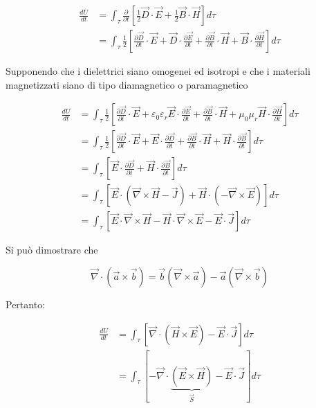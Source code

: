 \begin{equation*}
	\begin{aligned}
		\frac{dU}{dt} &= \int_{\tau}\frac{\partial}{\partial t} \left[ \frac{1}{2} \vec{D} \cdot \vec{E} + \frac{1}{2} \vec{B} \cdot \vec{H} \right] d\tau \\
		&= \int_{\tau} \frac{1}{2} \left[ \frac{\partial \vec{D}}{\partial t} \cdot \vec{E} +\vec{D} \cdot \frac{\partial \vec{E}}{\partial t} + \frac{\partial \vec{B}}{\partial t} \cdot \vec{H} + \vec{B} \cdot \frac{\partial \vec{H}}{\partial t}  \right] d\tau
	\end{aligned}
\end{equation*}

Supponendo che i dielettrici siano omogenei ed isotropi e che i materiali magnetizzati siano di tipo diamagnetico o paramagnetico

\begin{align*}
	\frac{dU}{dt} &= \int_{\tau} \frac{1}{2} \left[ \frac{\partial \vec{D}}{\partial t} \cdot \vec{E} + \varepsilon_0 \varepsilon_r \vec{E} \cdot \frac{\partial \vec{E}}{\partial t} + \frac{\partial \vec{B}}{\partial t} \cdot \vec{H} + \mu_0 \mu_r \vec{H} \cdot \frac{\partial \vec{H}}{\partial t}  \right] d\tau \\
	&= \int_{\tau} \frac{1}{2} \left[ \frac{\partial \vec{D}}{\partial t} \cdot \vec{E} + \vec{E} \cdot \frac{\partial \vec{D}}{\partial t} + \frac{\partial \vec{B}}{\partial t} \cdot \vec{H} + \vec{H} \cdot \frac{\partial \vec{B}}{\partial t}  \right] d\tau \\
	&= \int_{\tau} \left[ \vec{E} \cdot \frac{\partial \vec{D}}{\partial t} + \vec{H} \cdot \frac{\partial \vec{B}}{\partial t}  \right] d\tau \\
	&= \int_{\tau} \left[ \vec{E} \cdot \left( \vec{\nabla} \times \vec{H} -\vec{J}  \right)   + \vec{H} \cdot \left( -\vec{\nabla} \times \vec{E}  \right)    \right] d\tau \tag*{III e IV di Maxwell}\\
	&= \int_{\tau}\left[ \vec{E}\cdot  \vec{\nabla} \times \vec{H} -\vec{H} \cdot \vec{\nabla} \times \vec{E} -\vec{E} \cdot \vec{J}  \right] d\tau
\end{align*}

Si può dimostrare che

\[
	\vec{\nabla} \cdot (\vec{a} \times \vec{b} ) = \vec{b} (\vec{\nabla} \times \vec{a} ) - \vec{a} (\vec{\nabla} \times \vec{b} )
\]

Pertanto:

\begin{equation*}
	\begin{aligned}
		\frac{dU}{dt} &= \int_{\tau} \left[ \vec{\nabla} \cdot \left( \vec{H} \times \vec{E}  \right) - \vec{E} \cdot \vec{J} \right] d\tau \\
		&= \int_{\tau} \left[ - \vec{\nabla} \cdot \underbrace{\left( \vec{E} \times \vec{H}  \right)}_{\vec{S}} - \vec{E} \cdot \vec{J} \right] d\tau
	\end{aligned}
\end{equation*}

